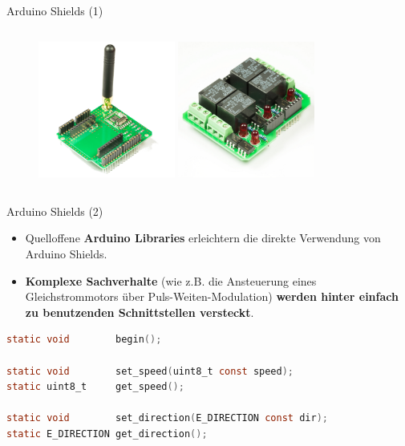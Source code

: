 \documentclass{beamer}
\begin{document}
\begin{frame}{Arduino Shields (1)}
\begin{columns}
\begin{column}{0.5\textwidth}
\begin{figure}
			\includegraphics[width=0.4\textwidth]{./images/funk-shield.jpg}
			\includegraphics[width=0.4\textwidth]{./images/relais-shield.jpg}
		\end{figure}
	\end{column}
\end{columns}
\end{frame}
\begin{frame}[fragile]{Arduino Shields (2)}
\begin{itemize}
	\item Quelloffene \textbf{Arduino Libraries} erleichtern die direkte Verwendung von Arduino Shields.
\end{itemize}
\begin{itemize}
	\item \textbf{Komplexe Sachverhalte} (wie z.B. die Ansteuerung eines Gleichstrommotors \"uber Puls-Weiten-Modulation) \textbf{werden hinter einfach zu benutzenden Schnittstellen versteckt}.
\end{itemize}
\begin{lstlisting}[frame=single, language=C]
static void        begin();

static void        set_speed(uint8_t const speed);
static uint8_t     get_speed();

static void        set_direction(E_DIRECTION const dir);
static E_DIRECTION get_direction();
\end{lstlisting}
\end{frame}
\end{document}
